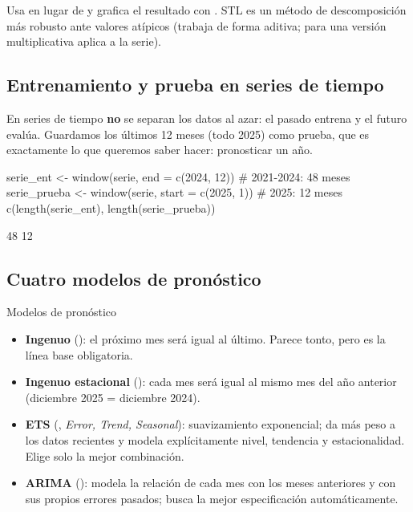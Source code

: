 \begin{hazlotu}
Usa  en lugar de 
y grafica el resultado con . STL es un método de
descomposición más robusto ante valores atípicos (trabaja de forma aditiva;
para una versión multiplicativa aplica  a la serie).
\end{hazlotu}

\subsection{Entrenamiento y prueba en series de tiempo}

En series de tiempo \textbf{no} se separan los datos al azar: el pasado entrena
y el futuro evalúa. Guardamos los últimos 12 meses (todo 2025) como prueba, que
es exactamente lo que queremos saber hacer: pronosticar un año.

\begin{rcode}
serie_ent    <- window(serie, end = c(2024, 12))   # 2021-2024: 48 meses
serie_prueba <- window(serie, start = c(2025, 1))  # 2025: 12 meses
c(length(serie_ent), length(serie_prueba))
\end{rcode}

\begin{rsalida}
[1] 48 12
\end{rsalida}

\subsection{Cuatro modelos de pronóstico}

\begin{concepto}{Modelos de pronóstico}
\begin{itemize}
  \item \textbf{Ingenuo} (): el próximo mes será igual al
        último. Parece tonto, pero es la línea base obligatoria.
  \item \textbf{Ingenuo estacional} (): cada mes será igual
        al mismo mes del año anterior (diciembre 2025 = diciembre 2024).
  \item \textbf{ETS} (, \emph{Error, Trend, Seasonal}):
        suavizamiento exponencial; da más peso a los datos recientes y modela
        explícitamente nivel, tendencia y estacionalidad. Elige solo la mejor
        combinación.
  \item \textbf{ARIMA} (): modela la relación de cada mes
        con los meses anteriores y con sus propios errores pasados;
         busca la mejor especificación automáticamente.
\end{itemize}
\end{concepto}


